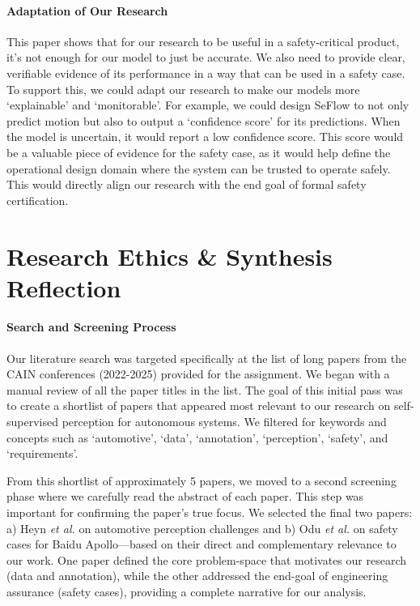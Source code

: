\documentclass{article}
\begin{document}
\paragraph{Adaptation of Our Research}
This paper shows that for our research to be useful in a safety-critical product, it's not enough for our model to just be accurate. We also need to provide clear, verifiable evidence of its performance in a way that can be used in a safety case. To support this, we could adapt our research to make our models more `explainable' and `monitorable'. For example, we could design SeFlow to not only predict motion but also to output a `confidence score' for its predictions. When the model is uncertain, it would report a low confidence score. This score would be a valuable piece of evidence for the safety case, as it would help define the operational design domain where the system can be trusted to operate safely. This would directly align our research with the end goal of formal safety certification.


\section{Research Ethics \& Synthesis Reflection}

\paragraph{Search and Screening Process}
Our literature search was targeted specifically at the list of long papers from the CAIN conferences (2022-2025) provided for the assignment. We began with a manual review of all the paper titles in the list. The goal of this initial pass was to create a shortlist of papers that appeared most relevant to our research on self-supervised perception for autonomous systems. We filtered for keywords and concepts such as `automotive', `data', `annotation', `perception', `safety', and `requirements'.

From this shortlist of approximately 5 papers, we moved to a second screening phase where we carefully read the abstract of each paper. This step was important for confirming the paper's true focus. We selected the final two papers: a) Heyn \textit{et al.} on automotive perception challenges and b) Odu \textit{et al.} on safety cases for Baidu Apollo—based on their direct and complementary relevance to our work. One paper defined the core problem-space that motivates our research (data and annotation), while the other addressed the end-goal of engineering assurance (safety cases), providing a complete narrative for our analysis.
\end{document}
